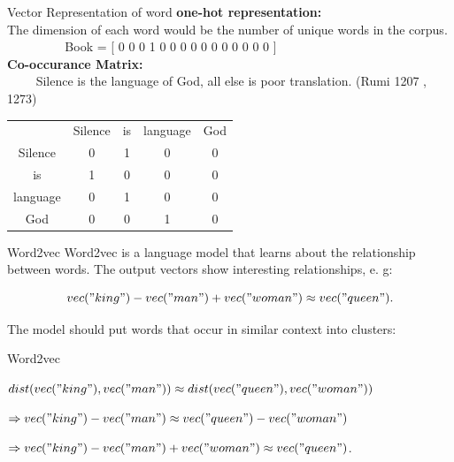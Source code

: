 \documentclass{beamer}
\begin{document}
\begin{frame}{Vector Representation of word}
\textbf{one-hot representation:} \\
 The dimension of each word would be the number of unique words in the corpus.\\
$\qquad$
  $\qquad$  Book = [ 0 0 0 1 0 0 0 0 0 0 0 0 0 0 0  ]
\\
\textbf{Co-occurance Matrix:} \\
 $\qquad$ Silence is the language of God, all else is poor translation. (Rumi 1207 , 1273)
 
\begin{center}
\begin{tabular}{ |c|c|c|c|c| } 
 \hline
          & Silence & is & language & God \\ 
 Silence  & 0 & 1 & 0  & 0 \\ 
 is       & 1 & 0 & 0 & 0  \\ 
 language & 0 & 1 & 0 & 0  \\ 
 God      & 0 & 0 & 1 & 0 \\ 
 \hline
\end{tabular}
\end{center}
 


\end{frame}


\begin{frame}{Word2vec}
Word2vec is a language model that learns about the relationship between words. The output vectors show interesting relationships, e. g:

$$vec("king") - vec("man") + vec("woman") \approx vec("queen").$$

The model should put words that occur in similar context into clusters:
\end{frame}

\begin{frame}{Word2vec}

\centering


\vspace{1em}
$dist(vec("king"), vec("man")) \approx dist(vec("queen"), vec("woman"))$

$\Rightarrow vec("king") - vec("man") \approx vec("queen") - vec("woman")$

$\Rightarrow vec("king") - vec("man") + vec("woman") \approx vec("queen")$.
\end{frame}
\end{document}
